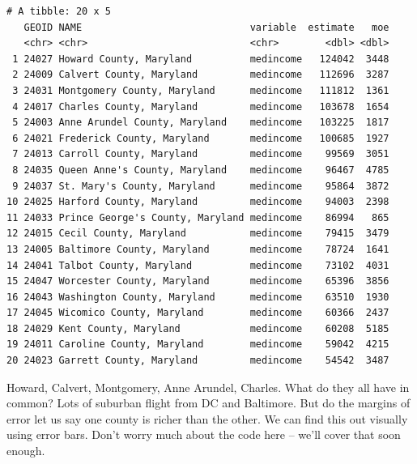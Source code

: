 \documentclass[
  letterpaper,
  DIV=11,
  numbers=noendperiod]{scrreprt}
\begin{document}
\begin{verbatim}
# A tibble: 20 x 5
   GEOID NAME                             variable  estimate   moe
   <chr> <chr>                            <chr>        <dbl> <dbl>
 1 24027 Howard County, Maryland          medincome   124042  3448
 2 24009 Calvert County, Maryland         medincome   112696  3287
 3 24031 Montgomery County, Maryland      medincome   111812  1361
 4 24017 Charles County, Maryland         medincome   103678  1654
 5 24003 Anne Arundel County, Maryland    medincome   103225  1817
 6 24021 Frederick County, Maryland       medincome   100685  1927
 7 24013 Carroll County, Maryland         medincome    99569  3051
 8 24035 Queen Anne's County, Maryland    medincome    96467  4785
 9 24037 St. Mary's County, Maryland      medincome    95864  3872
10 24025 Harford County, Maryland         medincome    94003  2398
11 24033 Prince George's County, Maryland medincome    86994   865
12 24015 Cecil County, Maryland           medincome    79415  3479
13 24005 Baltimore County, Maryland       medincome    78724  1641
14 24041 Talbot County, Maryland          medincome    73102  4031
15 24047 Worcester County, Maryland       medincome    65396  3856
16 24043 Washington County, Maryland      medincome    63510  1930
17 24045 Wicomico County, Maryland        medincome    60366  2437
18 24029 Kent County, Maryland            medincome    60208  5185
19 24011 Caroline County, Maryland        medincome    59042  4215
20 24023 Garrett County, Maryland         medincome    54542  3487
\end{verbatim}

Howard, Calvert, Montgomery, Anne Arundel, Charles. What do they all
have in common? Lots of suburban flight from DC and Baltimore. But do
the margins of error let us say one county is richer than the other. We
can find this out visually using error bars. Don't worry much about the
code here -- we'll cover that soon enough.
\end{document}
